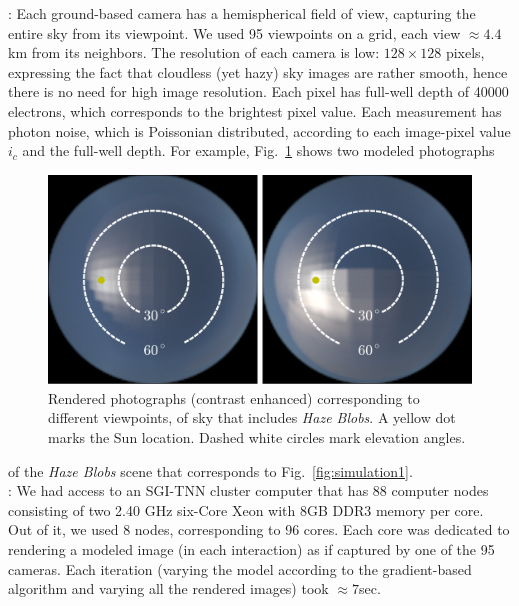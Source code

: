 \documentclass[10pt,letterpaper]{article}
\newcommand{\yoavcomment}[1]{}
\renewcommand{\yoavcomment}[1]{#1} %
\begin{document}
: Each ground-based camera has a hemispherical
field of view, capturing the entire sky from its viewpoint. We used 95
viewpoints on a grid, each view $\approx 4.4$km from its neighbors.
The resolution of each camera is low: $128\times 128$ pixels,
expressing the fact that cloudless (yet hazy) sky images are rather
smooth, hence there is no need for high image resolution. Each pixel
has full-well depth of 40000 electrons, which corresponds to the
brightest pixel value. Each measurement has photon noise, which is
Poissonian distributed, according to each image-pixel value $i_c$ and
the full-well depth. For example, Fig.~\ref{fig:simulation-results1}
shows two modeled photographs
\begin{figure}
  \centering
  \yoavcomment{\includegraphics[width=\columnwidth]{images/ref_images.pdf}}
  \caption{\small Rendered photographs (contrast enhanced)
    corresponding to different viewpoints, of sky that includes {\em
      Haze Blobs}. A yellow dot marks the Sun location. Dashed white
    circles mark elevation angles.}
  \label{fig:simulation-results1}
\end{figure}
of the  {\em Haze Blobs} scene that corresponds to Fig.~\ref{fig:simulation1}.\\


: We had access to an SGI-TNN cluster computer
that has 88 computer nodes consisting of two 2.40 GHz six-Core Xeon
with 8GB
DDR3 memory per core. Out of it, we used 8 nodes, corresponding to 96 cores. Each core was dedicated to rendering a modeled image (in each interaction) as if captured by one of the 95 cameras. Each iteration (varying the model according to the gradient-based algorithm and varying all the rendered images) took $\approx 7$sec.\\
\end{document}
